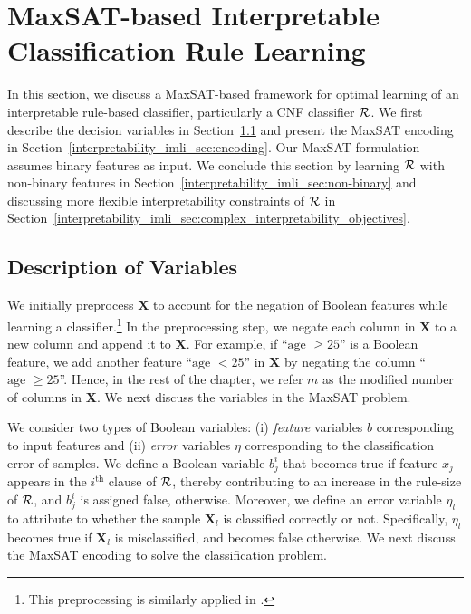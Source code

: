 \section{MaxSAT-based Interpretable Classification Rule Learning}
\label{interpretability_imli_sec:baseline}
In this section, we discuss a MaxSAT-based framework for optimal learning of an interpretable rule-based classifier, particularly a CNF classifier $ {\mathcal{R}} $. 
We first describe the decision variables in Section~\ref{interpretability_imli_sec:variables} and present the MaxSAT encoding  in Section~\ref{interpretability_imli_sec:encoding}. Our MaxSAT formulation assumes binary features as input. We
conclude this section by learning $ {\mathcal{R}} $ with non-binary features in Section~\ref{interpretability_imli_sec:non-binary} and discussing more flexible interpretability constraints of $ {\mathcal{R}} $ in Section~\ref{interpretability_imli_sec:complex_interpretability_objectives}.  



\subsection{Description of Variables}
\label{interpretability_imli_sec:variables} 
We initially preprocess $ \mathbf{X} $  to account for the negation of  Boolean features while learning a classifier.\footnote{This preprocessing is similarly applied in  \cite{malioutov2013exact}.} In the preprocessing step, we negate each column in $ \mathbf{X} $ to a new column and append it to $ \mathbf{X} $. For example, if ``$ \text{age }\ge 25 $'' is a Boolean feature, we add another feature ``$ \text{age }< 25 $'' in  $ \mathbf{X} $ by negating the column ``$ \text{age }\ge 25 $''. Hence, in the rest of the chapter, we refer $ m $ as the modified number of columns in $ \mathbf{X} $. We next discuss the variables in the MaxSAT problem. 

We consider two types of Boolean variables: (i) \emph{feature} variables $ b $ corresponding to input features and (ii) \emph{error} variables $ \eta $ corresponding to the classification error of samples. We define a Boolean variable $ b^i_j $ that becomes true if feature $ x_j $ appears in the $ i^\text{th} $ clause of $ {\mathcal{R}} $, thereby contributing to an increase in the rule-size of $ {\mathcal{R}} $, and $ b^i_j $ is assigned false, otherwise. Moreover, we define an error variable $ \eta_l $ to attribute to whether the sample $ \mathbf{X}_l $ is classified correctly or not. Specifically, $ \eta_l $ becomes true if $ \mathbf{X}_l $ is misclassified, and becomes false otherwise.  We next discuss the MaxSAT encoding to solve the classification problem.   




